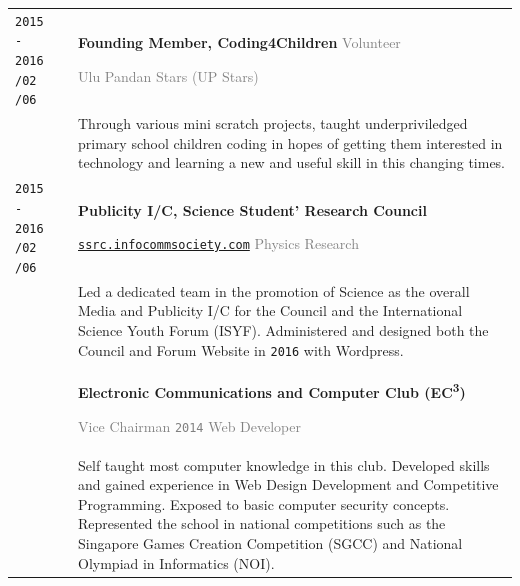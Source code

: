 \documentclass[11pt]{article}
\newcommand{\monoSp}[1]{{\usefont{T1}{rbtm}{m}{n} #1}}
\newcommand{\urllinkout}[2]{\href{#1}{\textcolor{text_link}{\small \texttt{#2}}}}
\newcommand{\code}[1]{\monoSp{#1}}
\begin{document}
{\begin{tabularx}{\textwidth}{@{}l p{0.20cm} X @{}}
		\makecell{\texttt{\large 2015 - 2016} \vspace{-1mm} \\ \texttt{\footnotesize /02} \hspace{1.5em} \texttt{\footnotesize /06}} & & \textbf{Founding Member, Coding4Children} \hfill \textcolor{gray}{Volunteer} \par \textcolor{gray}{Ulu Pandan Stars {\footnotesize (UP Stars)}}\\[-0.5em]
		& & {\small Through various mini \code{scratch} projects, taught underpriviledged primary school children coding in hopes of getting them interested in technology and learning a new and useful skill in this changing times. } \\
		\makecell{\texttt{\large 2015 - 2016} \vspace{-1mm} \\ \texttt{\footnotesize /02} \hspace{1.5em} \texttt{\footnotesize /06}} & & \textbf{Publicity I/C, Science Student' Research Council} \par \urllinkout{https://ssrc.infocommsociety.com/}{ssrc.infocommsociety.com}  \hfill \textcolor{gray}{Physics Research}\\[-0.5em]
		& & {\small Led a dedicated team in the promotion of Science as the overall Media and Publicity I/C for the Council and the International Science Youth Forum {\footnotesize (ISYF)}. Administered and designed both the Council and Forum Website in \texttt{\large 2016} with \code{Wordpress}. }\\
		\makecell{\texttt{\large 2011 - 2016}} & & \textbf{Electronic Communications and Computer Club (EC\textsuperscript{3})} \hfill \par \textcolor{gray}{Vice Chairman \hspace{1em} \texttt{2014} } \hfill \textcolor{gray}{Web Developer} \\[-0.5em]
		& & {\small Self taught most computer knowledge in this club. Developed skills and gained experience in Web Design Development and Competitive Programming. Exposed to basic computer security concepts. Represented the school in national competitions such as the Singapore Games Creation Competition {\footnotesize (SGCC)} and National Olympiad in Informatics {\footnotesize (NOI)}. }
	\end{tabularx}
}
\end{document}
